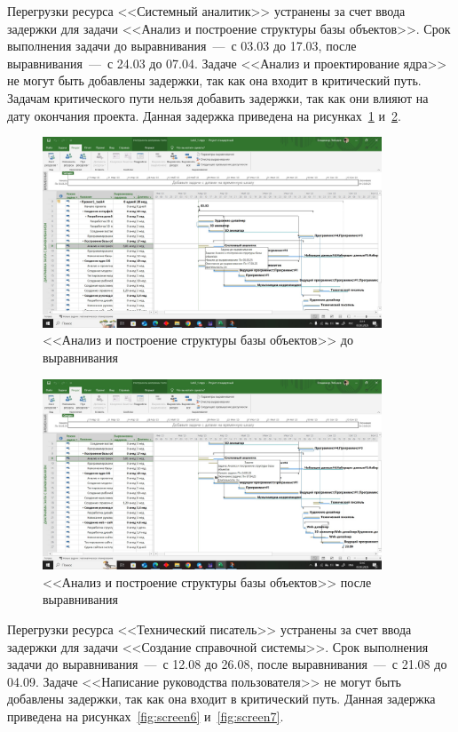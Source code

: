 Перегрузки ресурса <<Системный аналитик>> устранены за счет ввода задержки для задачи <<Анализ и построение структуры базы объектов>>.
Срок выполнения задачи до выравнивания~---~с 03.03 до 17.03, после выравнивания~---~с 24.03 до 07.04.
Задаче <<Анализ и проектирование ядра>> не могут быть добавлены задержки, так как она входит в критический путь.
Задачам критического пути нельзя добавить задержки, так как они влияют на дату окончания проекта.
Данная задержка приведена на рисунках~\ref{fig:screen4} и~\ref{fig:screen5}.

\begin{figure}[H]
	\centering
	\includegraphics[width=0.9\textwidth]{img/task1/screen4.jpg}
	\caption{<<Анализ и построение структуры базы объектов>> до выравнивания}
	\label{fig:screen4}
\end{figure}

\begin{figure}[H]
	\centering
	\includegraphics[width=0.9\textwidth]{img/task1/screen5.jpg}
	\caption{<<Анализ и построение структуры базы объектов>> после выравнивания}
	\label{fig:screen5}
\end{figure}

Перегрузки ресурса <<Технический писатель>> устранены за счет ввода задержки для задачи <<Создание справочной системы>>.
Срок выполнения задачи до выравнивания~---~с 12.08 до 26.08, после выравнивания~---~с 21.08 до 04.09.
Задаче <<Написание руководства пользователя>> не могут быть добавлены задержки, так как она входит в критический путь.
Данная задержка приведена на рисунках~\ref{fig:screen6} и~\ref{fig:screen7}.

